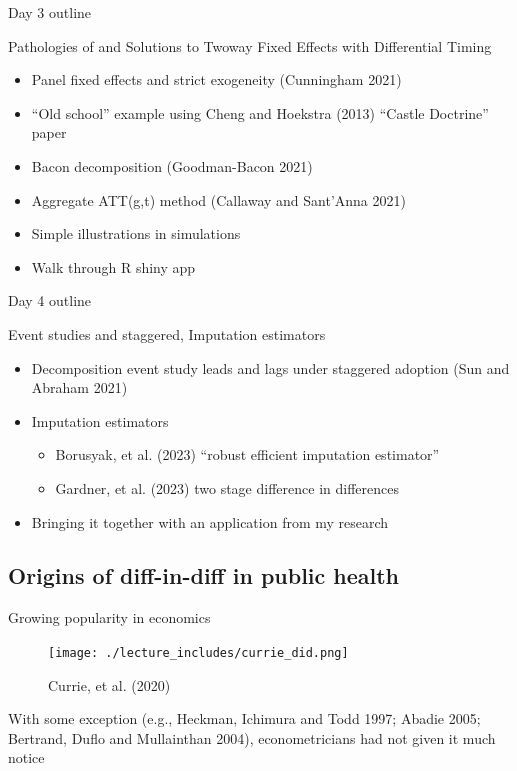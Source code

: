 \documentclass{beamer}
\begin{document}
\begin{frame}{Day 3 outline}

Pathologies of and Solutions to Twoway Fixed Effects with Differential Timing
	\begin{itemize}
	\item Panel fixed effects and strict exogeneity (Cunningham 2021) 
	\item ``Old school'' example using Cheng and Hoekstra (2013) “Castle Doctrine” paper
	\item Bacon decomposition (Goodman-Bacon 2021)
	\item Aggregate ATT(g,t) method (Callaway and Sant’Anna 2021)
	\item Simple illustrations in simulations
	\item Walk through R shiny app
	\end{itemize}

\end{frame}


\begin{frame}{Day 4 outline}

Event studies and staggered, Imputation estimators

\begin{itemize}
\item Decomposition event study leads and lags under staggered adoption (Sun and Abraham 2021)
\item Imputation estimators
		\begin{itemize}
		\item Borusyak, et al. (2023) “robust efficient imputation estimator”
		\item Gardner, et al. (2023) two stage difference in differences
		\end{itemize}
\item Bringing it together with an application from my research 
\end{itemize}

\end{frame}




\subsection{Origins of diff-in-diff in public health}

\begin{frame}{Growing popularity in economics}

	\begin{figure}
	\caption{Currie, et al. (2020)}
	\texttt{[image: ./lecture\_includes/currie\_did.png]}
	\end{figure}

\bigskip

\footnotesize

With some exception (e.g., Heckman, Ichimura and Todd 1997; Abadie 2005; Bertrand, Duflo and Mullainthan 2004), econometricians had not given it much notice

\end{frame}
\end{document}
